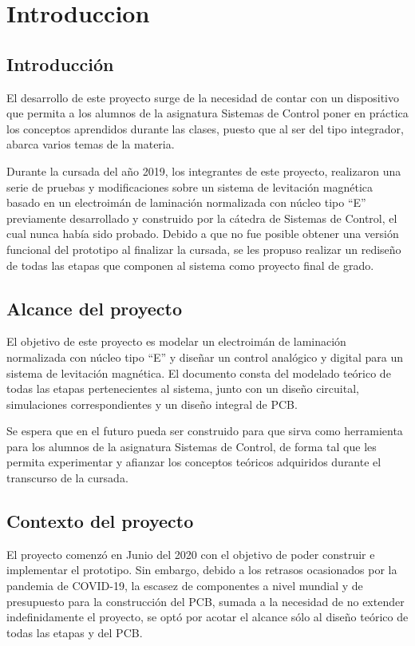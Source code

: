 \chapter{Introduccion}  \label{cap:Introducción}

\section{Introducción}

\noindent El desarrollo de este proyecto surge de la necesidad de contar con un dispositivo que permita a los alumnos de la asignatura Sistemas de Control poner en práctica los conceptos aprendidos durante las clases, puesto que al ser del tipo integrador,  abarca varios temas de la materia.

\noindent Durante la cursada del año 2019, los integrantes de este proyecto, realizaron una serie de pruebas y modificaciones sobre un sistema de levitación magnética basado en un electroimán de laminación normalizada con núcleo tipo “E” previamente desarrollado y construido por la cátedra de Sistemas de Control, el cual nunca había sido probado. Debido a que no fue posible obtener una versión funcional del prototipo al finalizar la cursada, se les propuso realizar un rediseño de todas las etapas que componen al sistema como proyecto final de grado. 


\section{Alcance del proyecto}

\noindent El objetivo de este proyecto es modelar un electroimán de laminación normalizada con núcleo tipo “E'' y diseñar un control analógico y digital para un sistema de levitación magnética. El documento consta del modelado teórico de todas las etapas pertenecientes al sistema, junto con un diseño circuital, simulaciones correspondientes y un diseño integral de PCB.

\noindent Se espera que en el futuro pueda ser construido para que sirva como herramienta para los alumnos de la asignatura  Sistemas de Control, de forma tal que les permita experimentar y afianzar los conceptos teóricos adquiridos durante el transcurso de la cursada.

\section{Contexto del proyecto}

\noindent El proyecto comenzó en Junio del 2020 con el objetivo de poder construir e implementar el prototipo. Sin embargo, debido a los retrasos ocasionados por la pandemia de COVID-19,  la escasez de componentes a nivel mundial y de presupuesto para la construcción del PCB, sumada a la  necesidad de no extender indefinidamente el proyecto, se optó por acotar el alcance sólo al diseño teórico de todas las etapas y del PCB. 

